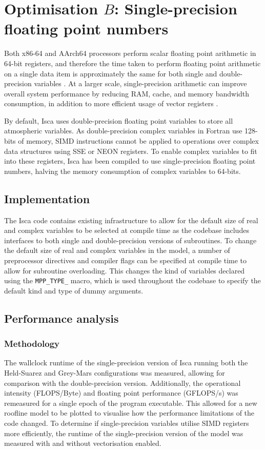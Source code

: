 \documentclass[a4paper,11pt]{report}
\begin{document}
\section{Optimisation $B$: Single-precision floating point numbers}
\label{sec:floating-pont}
Both x86-64 and AArch64 processors perform scalar floating point arithmetic in 64-bit registers, and therefore the time taken to perform floating point arithmetic on a single data item is approximately the same for both single and double-precision variables \cite{reinders2013intel, aa2011armv8}.   At a larger scale, single-precision arithmetic can improve overall system performance by reducing RAM, cache, and memory bandwidth consumption, in addition to more efficient usage of vector registers \cite{goldberg1991every}.
\par
By default, Isca uses double-precision floating point variables to store all atmospheric variables. As double-precision complex variables in Fortran use 128-bits of memory, SIMD instructions cannot be applied to operations over complex data structures using SSE or NEON registers. To enable complex variables to fit into these registers, Isca has been compiled to use single-precision floating point numbers, halving the memory consumption of complex variables to 64-bits.

\subsection{Implementation}
The Isca code contains existing infrastructure to allow for the default size of real and complex variables to be selected at compile time as the codebase includes interfaces to both single and double-precision versions of subroutines. To change the default size of real and complex variables in the model, a number of preprocessor directives and compiler flags can be specified at compile time to allow for subroutine overloading. This changes the kind of variables declared using the \texttt{MPP\_TYPE\_} macro, which is used throughout the codebase to specify the default kind and type of dummy arguments. 



\subsection{Performance analysis}

\subsubsection{Methodology}
The wallclock runtime of the single-precision version of Isca running both the Held-Suarez and Grey-Mars configurations was measured, allowing for comparison with the double-precision version. Additionally, the operational intensity (FLOPS/Byte) and floating point performance (GFLOPS/s) was remeasured for a single epoch of the program executable. This allowed for a new roofline model to be plotted to visualise how the performance limitations of the code changed. To determine if single-precision variables utilise SIMD registers more efficiently, the runtime of the single-precision version of the model was measured with and without vectorisation enabled. 
\end{document}
